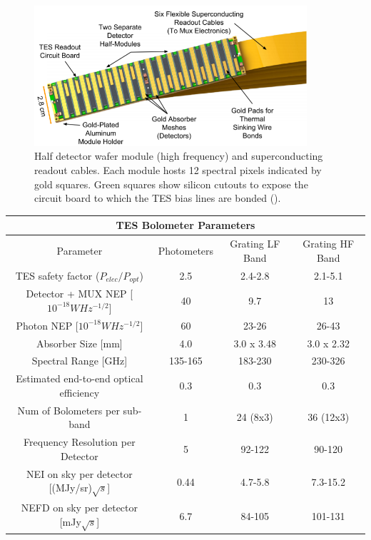 \documentclass[manuscript]{aastex}
\begin{document}
\begin{figure}[H]
\centering
\captionsetup{width=0.9\textwidth}
\includegraphics[width=0.9\textwidth]{jon4.PNG}
\caption[Diagram of a Half Detector Module -(\cite{Hunacek2016b})]{Half detector wafer module (high frequency) and superconducting readout cables. Each module hosts 12 spectral pixels indicated by gold squares. Green squares show silicon cutouts to expose the circuit board to which the TES bias lines are bonded (\cite{Hunacek2016b}).}
\label{fig:jon4}
\end{figure}

\begin{center}
    \begin{tabular}{|c|c|c|c|}
    \hline
    \multicolumn{4}{c}{TES Bolometer Parameters} \\
    \hline
    \hline
    Parameter & Photometers & Grating LF Band & Grating HF Band \\
    \hline
    TES safety factor ($P_{elec}/P_{opt}$) & 2.5 & 2.4-2.8 & 2.1-5.1 \\
    Detector + MUX NEP [$10^{-18} W Hz^{-1/2}$] & 40 & 9.7 & 13 \\
    Photon NEP [$10^{-18} W Hz^{-1/2}$] & 60 & 23-26 & 26-43 \\
    Absorber Size [mm] & 4.0 & 3.0 x 3.48 & 3.0 x 2.32 \\
    Spectral Range [GHz] & 135-165 & 183-230 & 230-326 \\
    Estimated end-to-end optical efficiency & 0.3 & 0.3 & 0.3 \\
    Num of Bolometers per sub-band & 1 & 24 (8x3) & 36 (12x3) \\
    Frequency Resolution per Detector & 5 & 92-122 & 90-120 \\
    NEI on sky per detector [(MJy/sr)$\sqrt{s}$] & 0.44 & 4.7-5.8 & 7.3-15.2 \\
    NEFD on sky per detector [mJy$\sqrt{s}$] & 6.7 & 84-105 & 101-131 \\
    \hline
    \end{tabular}
\end{center}
\end{document}

